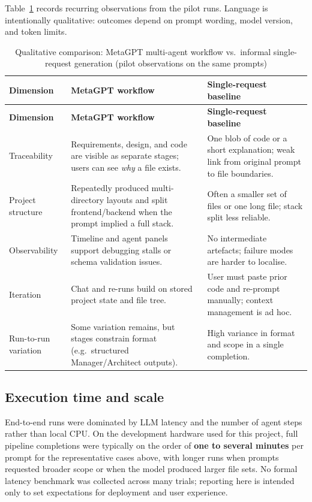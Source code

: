 Table~\ref{tab:exp_qualitative} records recurring observations from the pilot runs. Language is intentionally qualitative: outcomes depend on prompt wording, model version, and token limits.

\renewcommand{\arraystretch}{1.25}
\begin{longtable}{|p{3.0cm}|p{5.5cm}|p{5.5cm}|}
\caption{Qualitative comparison: MetaGPT multi-agent workflow vs.\ informal single-request generation (pilot observations on the same prompts)}
\label{tab:exp_qualitative}
\\
\hline
\textbf{Dimension} & \textbf{MetaGPT workflow} & \textbf{Single-request baseline} \\
\hline
\endfirsthead
\hline
\textbf{Dimension} & \textbf{MetaGPT workflow} & \textbf{Single-request baseline} \\
\hline
\endhead
\hline
\endfoot
\hline
\endlastfoot
Traceability & Requirements, design, and code are visible as separate stages; users can see \emph{why} a file exists. & One blob of code or a short explanation; weak link from original prompt to file boundaries. \\
\hline
Project structure & Repeatedly produced multi-directory layouts and split frontend/backend when the prompt implied a full stack. & Often a smaller set of files or one long file; stack split less reliable. \\
\hline
Observability & Timeline and agent panels support debugging stalls or schema validation issues. & No intermediate artefacts; failure modes are harder to localise. \\
\hline
Iteration & Chat and re-runs build on stored project state and file tree. & User must paste prior code and re-prompt manually; context management is ad hoc. \\
\hline
Run-to-run variation & Some variation remains, but stages constrain format (e.g.\ structured Manager/Architect outputs). & High variance in format and scope in a single completion. \\
\hline
\end{longtable}

\subsection{Execution time and scale}

End-to-end runs were dominated by LLM latency and the number of agent steps rather than local CPU. On the development hardware used for this project, full pipeline completions were typically on the order of \textbf{one to several minutes} per prompt for the representative cases above, with longer runs when prompts requested broader scope or when the model produced larger file sets. No formal latency benchmark was collected across many trials; reporting here is intended only to set expectations for deployment and user experience.

